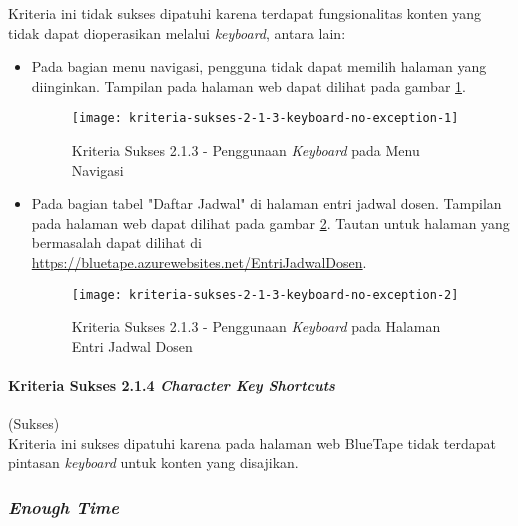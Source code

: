 Kriteria ini tidak sukses dipatuhi karena terdapat fungsionalitas konten yang tidak dapat dioperasikan melalui \textit{keyboard}, antara lain:

\begin{itemize}
    \item Pada bagian menu navigasi, pengguna tidak dapat memilih halaman yang diinginkan. Tampilan pada halaman web dapat dilihat pada gambar \ref{fig:2.1.3_keyboard_no_exception_1}.
    \begin{figure}[H]
        \centering  
        \texttt{[image: kriteria-sukses-2-1-3-keyboard-no-exception-1]}  
        \caption[Kriteria Sukses 2.1.3 - Penggunaan \textit{Keyboard} pada Menu Navigasi]{Kriteria Sukses 2.1.3 - Penggunaan \textit{Keyboard} pada Menu Navigasi}
        \label{fig:2.1.3_keyboard_no_exception_1}  
    \end{figure} 

    \item Pada bagian tabel "Daftar Jadwal" di halaman entri jadwal dosen. Tampilan pada halaman web dapat dilihat pada gambar \ref{fig:2.1.3_keyboard_no_exception_2}. Tautan untuk halaman yang bermasalah dapat dilihat di \url{https://bluetape.azurewebsites.net/EntriJadwalDosen}.
    \begin{figure}[H]
        \centering  
        \texttt{[image: kriteria-sukses-2-1-3-keyboard-no-exception-2]}  
        \caption[Kriteria Sukses 2.1.3 - Penggunaan \textit{Keyboard} pada Halaman Entri Jadwal Dosen]{Kriteria Sukses 2.1.3 - Penggunaan \textit{Keyboard} pada Halaman Entri Jadwal Dosen}
        \label{fig:2.1.3_keyboard_no_exception_2}  
    \end{figure} 
\end{itemize}

\paragraph{Kriteria Sukses 2.1.4 \textit{Character Key Shortcuts}}
\label{par:kepatuhan_bluetape_kriteria_sukses_2.1.4}
(Sukses)\\

Kriteria ini sukses dipatuhi karena pada halaman web BlueTape tidak terdapat pintasan \textit{keyboard} untuk konten yang disajikan.

\subsubsection{\textit{Enough Time}}
\label{subsubsec:kepatuhan_bluetape_enough_time}

